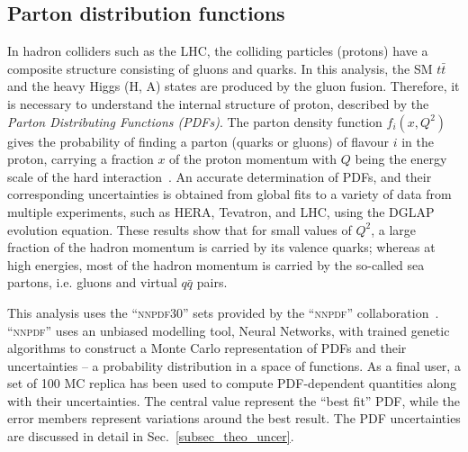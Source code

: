 \subsection{Parton distribution functions}
In hadron colliders such as the LHC, the colliding particles (protons) have a composite structure consisting of gluons and quarks. In this analysis, the SM $t\bar t$ and the heavy Higgs (H, A) states are produced by the gluon fusion. Therefore, it is necessary to understand the internal structure of proton, described by the \textit{Parton Distributing Functions (PDFs)}. The parton density function $f_{i}(x, Q^2)$ gives the probability of finding a parton (quarks or gluons) of flavour $i$ in the proton, carrying a fraction $x$ of the proton momentum with $Q$ being the energy scale of the hard interaction~\cite{Placakyte:2011az}. An accurate determination of PDFs, and their corresponding uncertainties is obtained from global fits to a variety of data from multiple experiments, such as HERA, Tevatron, and LHC, using the DGLAP evolution equation. These results show that for small values of $Q^2$, a large fraction of the hadron momentum is carried by its valence quarks; whereas at high energies, most of the hadron momentum is carried by the so-called sea partons, i.e. gluons and virtual $q\bar q$ pairs.

This analysis uses the ``\textsc{nnpdf30}” sets provided by the ``\textsc{nnpdf}” collaboration~\cite{nnpdf_sets}. ``\textsc{nnpdf}” uses an unbiased modelling tool, Neural Networks, with trained genetic algorithms to construct a Monte Carlo representation of PDFs and their uncertainties – a probability distribution in a space of functions. As a final user, a set of 100 MC replica has been used to compute PDF-dependent quantities along with their uncertainties. The central value represent the ``best fit'' PDF, while the error members represent variations around the best result. The PDF uncertainties are discussed in detail in Sec.~\ref{subsec_theo_uncer}.



